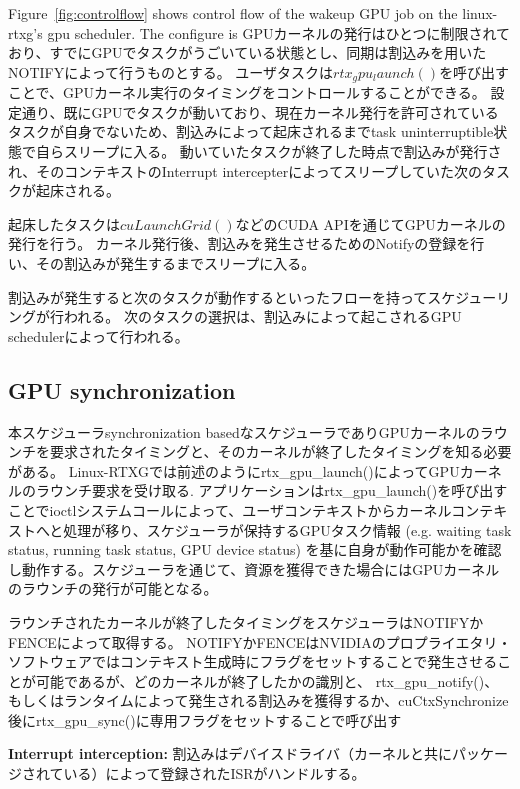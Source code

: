 Figure~\ref{fig:controlflow} shows control flow of the wakeup GPU job on the linux-rtxg's gpu scheduler.
The configure is GPUカーネルの発行はひとつに制限されており、すでにGPUでタスクがうごいている状態とし、同期は割込みを用いたNOTIFYによって行うものとする。
ユーザタスクは$rtx_gpu_launch()$を呼び出すことで、GPUカーネル実行のタイミングをコントロールすることができる。
設定通り、既にGPUでタスクが動いており、現在カーネル発行を許可されているタスクが自身でないため、割込みによって起床されるまでtask uninterruptible状態で自らスリープに入る。
動いていたタスクが終了した時点で割込みが発行され、そのコンテキストのInterrupt intercepterによってスリープしていた次のタスクが起床される。

起床したタスクは$cuLaunchGrid()$などのCUDA APIを通じてGPUカーネルの発行を行う。
カーネル発行後、割込みを発生させるためのNotifyの登録を行い、その割込みが発生するまでスリープに入る。

割込みが発生すると次のタスクが動作するといったフローを持ってスケジューリングが行われる。
次のタスクの選択は、割込みによって起こされるGPU schedulerによって行われる。

\subsection{GPU synchronization}
本スケジューラsynchronization basedなスケジューラでありGPUカーネルのラウンチを要求されたタイミングと、そのカーネルが終了したタイミングを知る必要がある。
Linux-RTXGでは前述のようにrtx\_gpu\_launch()によってGPUカーネルのラウンチ要求を受け取る.
アプリケーションはrtx\_gpu\_launch()を呼び出すことでioctlシステムコールによって、ユーザコンテキストからカーネルコンテキストへと処理が移り、スケジューラが保持するGPUタスク情報 (e.g. waiting task status, running task status, GPU device status) を基に自身が動作可能かを確認し動作する。スケジューラを通じて、資源を獲得できた場合にはGPUカーネルのラウンチの発行が可能となる。

ラウンチされたカーネルが終了したタイミングをスケジューラはNOTIFYかFENCEによって取得する。
NOTIFYかFENCEはNVIDIAのプロプライエタリ・ソフトウェアではコンテキスト生成時にフラグをセットすることで発生させることが可能であるが、どのカーネルが終了したかの識別と、
rtx\_gpu\_notify()、もしくはランタイムによって発生される割込みを獲得するか、cuCtxSynchronize後にrtx\_gpu\_sync()に専用フラグをセットすることで呼び出す

\textbf{Interrupt interception:}
割込みはデバイスドライバ（カーネルと共にパッケージされている）によって登録されたISRがハンドルする。

